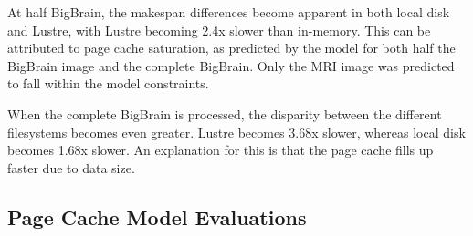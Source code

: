 At half BigBrain, the makespan differences become apparent in both local disk 
and Lustre, with Lustre becoming 2.4x slower than in-memory. This 
can be attributed to page cache saturation, as predicted by the model for both 
half the BigBrain image and the complete BigBrain. Only the MRI image was 
predicted to fall within the model constraints. 

When the complete BigBrain is processed, the disparity between the different 
filesystems becomes even greater. Lustre becomes 3.68x slower, whereas local 
disk becomes 1.68x slower. An explanation for this is that the page cache fills 
up faster due to data size.

\subsection{Page Cache Model Evaluations}
